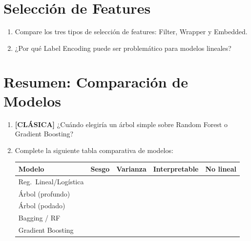 \documentclass[11pt,a4paper]{article}
\begin{document}
\section{Selecci\'on de Features}

\begin{enumerate}[label=\textbf{P\arabic*.}, resume]

\item Compare los tres tipos de selecci\'on de features: Filter, Wrapper y Embedded.

\item ¿Por qu\'e Label Encoding puede ser problem\'atico para modelos lineales?

\end{enumerate}

\section{Resumen: Comparaci\'on de Modelos}

\begin{enumerate}[label=\textbf{P\arabic*.}, resume]

\item \leavevmode

\begin{classicbox}
\textcolor{tdred}{\textbf{[CL\'ASICA]}} ¿Cu\'ando elegiría un \'arbol simple sobre
Random Forest o Gradient Boosting?
\end{classicbox}

\item Complete la siguiente tabla comparativa de modelos:

\vspace{0.3cm}
\begin{center}
\begin{tabular}{lcccc}
\toprule
\textbf{Modelo} & \textbf{Sesgo} & \textbf{Varianza} & \textbf{Interpretable} & \textbf{No lineal}\\
\midrule
Reg.\ Lineal/Log\'istica & & & &\\
\'Arbol (profundo) & & & &\\
\'Arbol (podado) & & & &\\
Bagging / RF & & & &\\
Gradient Boosting & & & &\\
\bottomrule
\end{tabular}
\end{center}

\end{enumerate}
\end{document}

